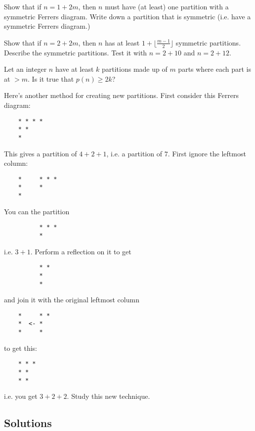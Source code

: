 \newpage
\begin{ex}
Show that if $n = 1 + 2m$, then $n$ must have (at least) one partition
with a symmetric Ferrers diagram.
Write down a partition that is symmetric (i.e. have a symmetric
Ferrers diagram.)
\end{ex}

%
%


\newpage
\begin{ex}
Show that if $n = 2 + 2m$,
then $n$ has at least $1 + \lfloor \frac{m-1}{2} \rfloor$
symmetric partitions. 
Describe the symmetric partitions.
Test it with $n = 2 + 10$ and $n = 2 + 12$.
\end{ex}

%
%
%


\newpage
\begin{ex}
Let an integer $n$ have at least $k$ partitions
made up of $m$ parts where each part is at $> m$.
Is it true that $p(n) \geq 2k$?
\end{ex}


\newpage
\begin{ex}
Here's another method for creating new partitions.
First consider this Ferrers diagram:
\begin{verbatim}
    * * * *
    * * 
    *
\end{verbatim}
This gives a partition of $4 + 2 + 1$, i.e. a partition of $7$.
First ignore the leftmost column:
\begin{verbatim}
    *     * * *
    *     * 
    *
\end{verbatim}
You can the partition 
\begin{verbatim}
          * * *
          * 
\end{verbatim}
i.e. $3 + 1$.
Perform a reflection on it to get
\begin{verbatim}
          * *
          *
          * 
\end{verbatim}
and join it with the original leftmost column 
\begin{verbatim}
    *     * *
    *  <- *   
    *     *
\end{verbatim}
to get this:
\begin{verbatim}
    * * *
    * *   
    * *
\end{verbatim}
i.e. you get $3 + 2 + 2$.
Study this new technique.
\end{ex}

\newpage
\subsection*{Solutions}


